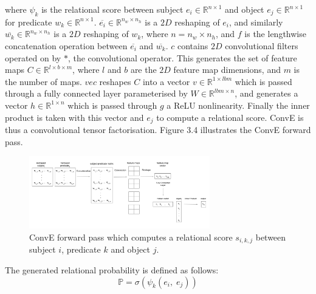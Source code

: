 \noindent where $ \psi_k $ is the relational score between subject $ e_i \in \mathbb{R}^{n \times 1} $ and object $ e_j \in \mathbb{R}^{n \times 1} $ for predicate $ w_k \in \mathbb{R}^{n \times 1} $. $ \overline{e_i} \in \mathbb{R}^{n_w \times n_h} $ is a $ 2D $ reshaping of $ e_i $, and similarly $ \overline{w_k} \in \mathbb{R}^{n_w \times n_h} $ is a $ 2D $ reshaping of $ w_k $, where $ n = n_w \times n_h $, and $ f $ is the lengthwise concatenation operation between $ \overline{e_i} $ and $ \overline{w_k} $. $ c $ contains $ 2D $ convolutional filters operated on by $ * $, the convolutional operator. This generates the set of feature maps $ C \in \mathbb{R}^{l \times b \times m} $, where $ l $ and $ b $ are the $ 2D $ feature map dimensions, and $ m $ is the number of maps. $ vec $ reshapes $ C $ into a vector $ v \in \mathbb{R}^{1 \times lbm} $ which is passed through a fully connected layer parameterised by $ W \in \mathbb{R}^{lbm \times n} $, and generates a vector $ h \in \mathbb{R}^{1 \times n} $ which is passed through $ g $ a ReLU nonlinearity. Finally the inner product is taken with this vector and $ e_j $ to compute a relational score. ConvE is thus a convolutional tensor factorisation. Figure 3.4 illustrates the ConvE forward pass.

\begin{figure}[H]
   	\centering
    	\includegraphics[width=0.7\textwidth, height=0.4\textwidth]{convolutional_entity_representations_final}
	\caption{ConvE forward pass which computes a relational score $ s_{i,k,j} $ between subject $ i $, predicate $ k $ and object $ j $.}
\end{figure}

\newpage

\noindent The generated relational probability is defined as follows: 
\begin{equation}
	\mathbb{P} = \sigma(\psi_k(e_i, \; e_j)) 
\end{equation}

